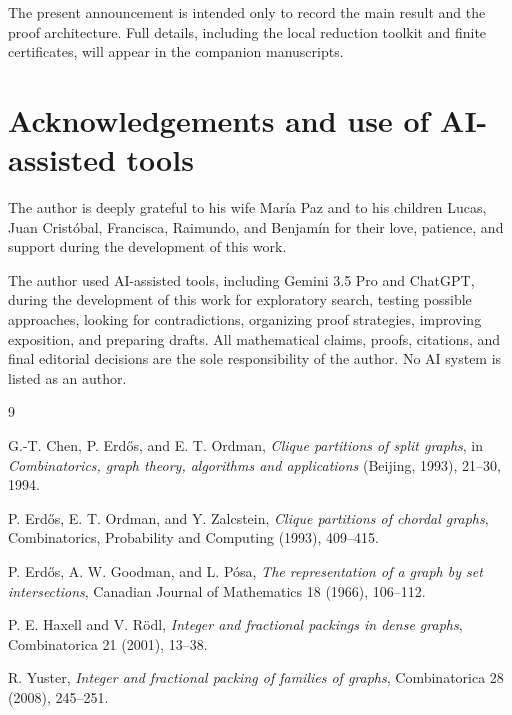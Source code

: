 \documentclass[11pt]{article}
\begin{document}
The present announcement is intended only to record the main result and the proof architecture. Full details, including the local reduction toolkit and finite certificates, will appear in the companion manuscripts.

\section*{Acknowledgements and use of AI-assisted tools}

The author is deeply grateful to his wife María Paz and to his children Lucas, Juan Cristóbal, Francisca, Raimundo, and Benjamín for their love, patience, and support during the development of this work.

The author used AI-assisted tools, including Gemini 3.5 Pro and ChatGPT, during the development of this work for exploratory search, testing possible approaches, looking for contradictions, organizing proof strategies, improving exposition, and preparing drafts. All mathematical claims, proofs, citations, and final editorial decisions are the sole responsibility of the author. No AI system is listed as an author.

\begin{thebibliography}{9}

G.-T. Chen, P. Erdős, and E. T. Ordman,
\emph{Clique partitions of split graphs},
in \emph{Combinatorics, graph theory, algorithms and applications} (Beijing, 1993), 21--30, 1994.

P. Erdős, E. T. Ordman, and Y. Zalcstein,
\emph{Clique partitions of chordal graphs},
Combinatorics, Probability and Computing (1993), 409--415.

P. Erdős, A. W. Goodman, and L. Pósa,
\emph{The representation of a graph by set intersections},
Canadian Journal of Mathematics 18 (1966), 106--112.

P. E. Haxell and V. Rödl,
\emph{Integer and fractional packings in dense graphs},
Combinatorica 21 (2001), 13--38.

R. Yuster,
\emph{Integer and fractional packing of families of graphs},
Combinatorica 28 (2008), 245--251.

\end{thebibliography}
\end{document}
